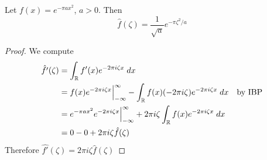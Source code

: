 \begin{lem}
    Let $f(x) = e^{-\pi a x^2}$, $a > 0$. Then
    \[
        \hat{f}(\zeta) = \frac{1}{\sqrt{a}}e^{-\pi \zeta^2 / a}
    \]   
\end{lem}
\begin{proof}
    We compute 
    \begin{align*}
        \hat{f'}(\zeta) &= \int_{\mathbb{R}} f'(x) e^{-2 \pi i \zeta x} \; dx \\
        &= f(x) e^{-2 \pi i \zeta x} \Big|_{-\infty}^\infty - \int_{\mathbb{R}} f(x) (-2 \pi i \zeta) e^{-2 \pi i \zeta x} \; dx \quad \text{by IBP}\\
        &= e^{-\pi a x^2}e^{-2 \pi i \zeta x} \Big|_{-\infty}^\infty + 2 \pi i \zeta \int_{\mathbb{R}} f(x) e^{-2 \pi i \zeta x} \; dx \\
        &= 0 - 0 + 2 \pi i \zeta \hat{f}(\zeta)
    \end{align*}
    Therefore $\hat{f'}(\zeta) = 2 \pi i \zeta \hat{f}(\zeta)$
    

\end{proof}
